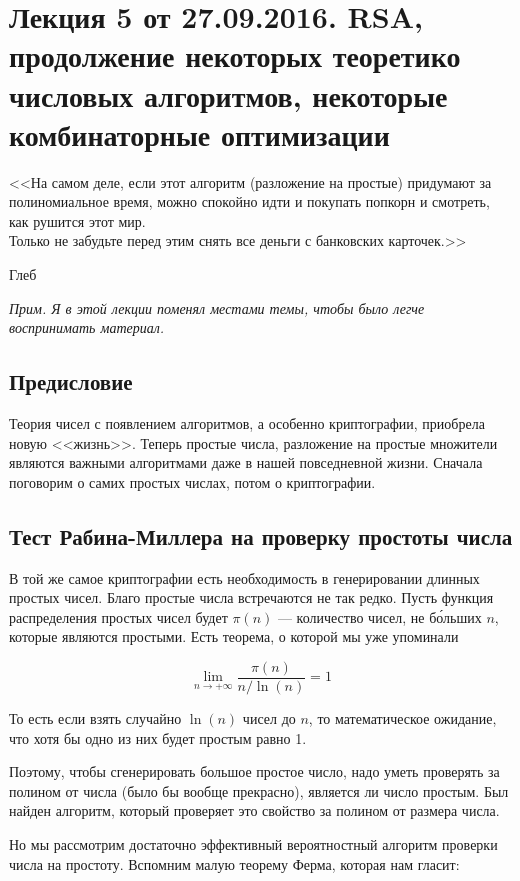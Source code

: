 \documentclass[a4paper, 12pt]{article}
\begin{document}
\pagestyle{fancy}

\section{Лекция 5 от 27.09.2016. RSA, продолжение некоторых теоретико числовых
алгоритмов, некоторые комбинаторные оптимизации}
\epigraph{<<На самом деле, если этот алгоритм (разложение на простые) 
придумают за полиномиальное время, можно спокойно идти и покупать
попкорн и смотреть, как рушится этот мир.
\\
Только не забудьте перед этим снять все деньги с банковских карточек.>>}
{Глеб}

\textit{Прим. Я в этой лекции поменял местами темы, чтобы было легче воспринимать
материал.}

\subsection{Предисловие}

Теория чисел с появлением алгоритмов, а особенно криптографии, приобрела новую 
<<жизнь>>. Теперь простые числа, разложение на простые множители являются
важными алгоритмами даже в нашей повседневной жизни. Сначала поговорим о самих
простых числах, потом о криптографии.

\subsection{Тест Рабина-Миллера на проверку простоты числа}

В той же самое криптографии есть необходимость в генерировании длинных простых
чисел. Благо простые числа встречаются не так редко. Пусть
функция распределения простых чисел будет $\pi(n)$ --- количество
чисел, не б\'{о}льших $n$, которые являются простыми. Есть теорема, о которой
мы уже упоминали

\[
  \lim\limits_{n \to +\infty} \frac{\pi(n)}{n/\ln(n)} = 1
\]

То есть если взять случайно $\ln(n)$ чисел до $n$, то математическое ожидание, 
что хотя бы одно из них будет простым равно 1.

Поэтому, чтобы сгенерировать большое простое число, надо уметь проверять за
полином от числа (было бы вообще прекрасно), является ли число простым. Был
найден алгоритм, который проверяет это свойство за полином от размера числа.

Но мы рассмотрим достаточно эффективный вероятностный алгоритм проверки числа
на простоту. Вспомним малую теорему Ферма, которая нам гласит:
\end{document}
